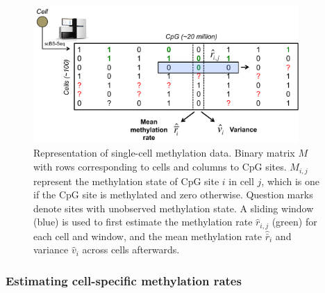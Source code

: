 \begin{figure}[htbp!]
\centering
\includegraphics[width=0.9\textwidth]{method}
\caption[Representation of single-cell methylation data.]{Representation of single-cell methylation data. Binary matrix $M$ with rows corresponding to cells and columns to CpG sites. $M_{i,j}$ represent the methylation state of CpG site $i$ in cell $j$, which is one if the CpG site is methylated and zero otherwise. Question marks denote sites with unobserved methylation state. A sliding window (blue) is used to first estimate the methylation rate $\hat{r}_{i,j}$ (green) for each cell and window, and the mean methylation rate $\hat{\bar{r}}_i$ and variance $\hat{v}_i$ across cells afterwards.}
\label{fig:bs_method}
\end{figure}


\newcommand{\Xfw}{c^+}
\newcommand{\Xrv}{c^-}
\newcommand{\Xfws}{s^+_{i,j}}
\newcommand{\Xrvs}{s^-_{i,j}}
\newcommand{\XBin}{\operatorname{Bin}}
\newcommand{\Xse}{\operatorname{SE}}
\newcommand{\Xrij}{\hat{r}_{i,j}}
\newcommand{\Xri}{\hat{r}_i}
\newcommand{\Xwij}{w_{i,j}}
\newcommand{\Xrmi}{\hat{\overline{r}}_i}
\newcommand{\Xrvi}{\hat{v}_i}
\newcommand{\Xrvli}{\hat{v}^l_i}
\newcommand{\Xrvui}{\hat{v}^u_i}
\newcommand{\Xwjji}{w^{j,j^\prime}_i}


\subsubsection{Estimating cell-specific methylation rates}

